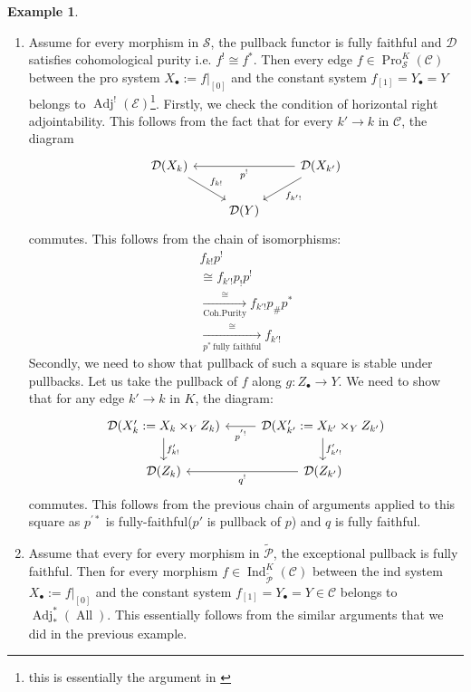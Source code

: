 \documentclass[14pt]{article}
\theoremstyle{definition}
\newtheorem{example}[theorem]{Example}
\newcommand{\E}{\mathcal{E}}
\newcommand{\D}{\mathcal{D}}
\renewcommand{\P}{\mathcal{P}}
\newcommand{\op}[1]{\operatorname{#1}}
\renewcommand{\S}{\mathcal{S}}
\newcommand{\Ca}{\mathcal{C}}
\newcommand{\bb}{\bullet}
\numberwithin{subsection}{section}
\begin{document}
\begin{example}\label{example:proandindadjointablemorphisms}
    \begin{enumerate}
        \item Assume for every morphism in $\S$, the pullback functor is fully faithful and $\D$ satisfies cohomological purity i.e. $f^! \cong f^*$. Then every edge $ f \in \op{Pro}^K_{\S}(\Ca)$ between the pro system $X_{\bb}:= f|_{[0]}$ and the constant system $f_{[1]}= Y_{\bb}= Y$ belongs to $\op{Adj}^!(\E)$\footnote{this is essentially the argument in \cite[Example 2.6]{yaylali2025rationalmotivesproalgebraicstacks}}. Firstly, we check the condition of horizontal right adjointability. This follows from the fact that for every $k' \to k$ in $\Ca$, the diagram 
        \begin{equation}
        \begin{tikzcd}
            \D(X_k) \arrow[dr,"f_{k!}"] && \D(X_{k'}) \arrow[ll,"p^!"] \arrow[dl,"f_{k'!}"] \\
            {} & \D(Y) & {}
            \end{tikzcd}
        \end{equation}
        commutes. This follows from the chain of isomorphisms:
       \begin{align*}
           f_{k!} p^! \\ \cong  f_{k'!}p_!p^! \\ \xrightarrow[\op{Coh. Purity}]{\cong} f_{k'!}p_{\#}p^* \\ \xrightarrow[p^*\,\text{fully faithful}]{\cong} f_{k'!}
       \end{align*}
       Secondly, we need to show that pullback of such a square is stable under pullbacks. Let us take the pullback of $f$ along $g: Z_{\bb} \to Y$. We need to show that for any edge $k' \to k$ in $K$, the diagram:
       \begin{equation}
            \begin{tikzcd}
            \D(X'_k:= X_k \times_Y Z_k) \arrow[d,"f'_{k!}"] & \D(X'_{k'}:=X_{k'} \times_Y Z_{k'}) \arrow[l,"p^{'!}"] \arrow[d,"f'_{k'!}"] \\
            \D(Z_k) &  \D(Z_{k'}) \arrow[l,"q^!"]
            \end{tikzcd} 
       \end{equation}
       commutes. This follows from the previous chain of arguments applied to this square as $p^{'*}$ is fully-faithful($p'$ is pullback of $p$) and $q$ is fully faithful.  

    \item Assume that every for every morphism in $\tilde{\P}$, the exceptional pullback is fully faithful. Then for every morphism $f \in \op{Ind}^K_{\tilde{\P}}(\Ca)$ between the ind system $X_{\bb}:=f|_{[0]}$ and the constant system $f_{[1]}=Y_{\bb}=Y \in \Ca$ belongs to $\op{Adj}^*_*(\op{All})$. This essentially follows from the similar arguments that we did in the previous example. 
    \end{enumerate}
    
\end{example}
\end{document}
